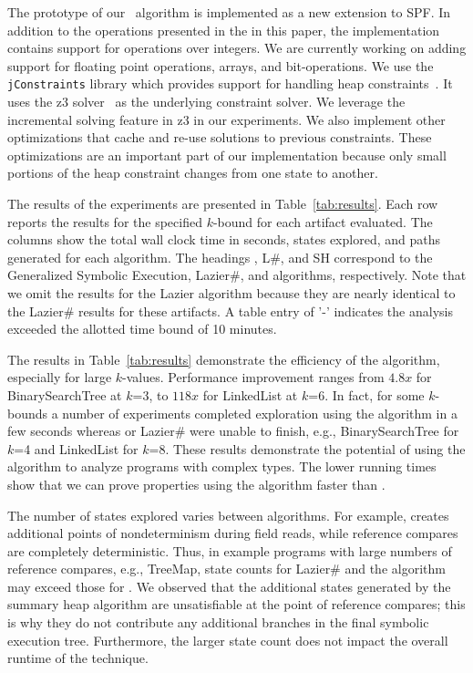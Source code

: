 The prototype of our~\symtxt{} algorithm is implemented as a new
extension to SPF.  In addition to the operations presented in the in
this paper, the implementation contains support for operations over
integers.  We are currently working on adding support for floating
point operations, arrays, and bit-operations.  We use the
\texttt{jConstraints} library which provides support for handling heap
constraints~\cite{ase2014-ghilrr,jpf2014-dghirr}. It uses the z3
solver~\cite{deMouraBjorner08Z3} as the underlying constraint
solver. We leverage the incremental solving feature in z3 in our
experiments. We also implement other optimizations that cache and
re-use solutions to previous constraints. These optimizations are an
important part of our implementation because only small portions of
the heap constraint changes from one state to another.

The results of the experiments are presented in Table~\ref{tab:results}. 
Each row reports the results for the specified $k$-bound 
for each artifact evaluated. The columns show the total
wall clock time in seconds, states explored, and paths generated for
each algorithm. The headings \gsetxt{}, L\#, and SH correspond
to the Generalized Symbolic Execution, Lazier\#, and \symtxt{}
algorithms, respectively. Note that we omit the results for
the Lazier algorithm because they are nearly identical to the Lazier\#
results for these artifacts. A table entry of  '-' indicates the analysis
exceeded the allotted time bound of 10 minutes.

The results in Table~\ref{tab:results} demonstrate the efficiency of the 
\symtxt{} algorithm, especially for
large $k$-values. Performance improvement ranges from $4.8x$ for
BinarySearchTree at $k$=3, to $118x$ for LinkedList at $k$=6. In fact,
for some $k$-bounds a number of experiments completed exploration
using the \symtxt{} algorithm in a few seconds whereas \gsetxt{} or Lazier\# were
unable to finish, e.g., BinarySearchTree for $k$=4 and LinkedList for
$k$=8. These results demonstrate the potential of using the \symtxt{} algorithm 
to analyze programs with complex types. The lower running times
show that we can prove properties using the \symtxt{} algorithm 
faster than \gsetxt{}.

The number of states explored varies between algorithms. For example,
\gsetxt{} creates additional points of nondeterminism during field reads, 
while reference compares are completely deterministic. Thus, in
example programs with large numbers of reference compares, e.g.,
TreeMap, state counts for Lazier\# and the \symtxt{} algorithm may
exceed those for \gsetxt{}. We observed that the additional states
generated by the summary heap algorithm are unsatisfiable at the point
of reference compares; this is why they do not contribute any
additional branches in the final symbolic execution tree. Furthermore,
the larger state count does not impact the overall runtime of the
technique.

